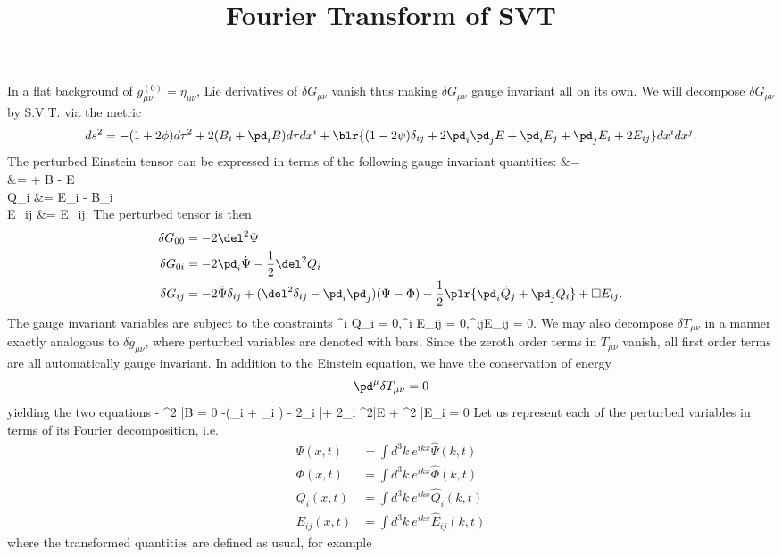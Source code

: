 \documentclass[10pt,letterpaper]{article}
\title{Fourier Transform of SVT}
\author{}
\date{}
\begin{document}
\maketitle 
In a flat background of $g_{\mu\nu}^{(0)} = \eta_{\mu\nu}$, Lie derivatives of $\delta G_{\mu\nu}$ vanish thus making $\delta G_{\mu\nu}$ gauge invariant all on its own. We will decompose $\delta G_{\mu\nu}$ by S.V.T. via the metric
\[
	ds^2 = -(1+2\phi)d\tau^2 + 2(B_i + \pd_i B)d\tau dx^i + \blr{ (1-2\psi)\delta_{ij} + 2\pd_i \pd_j E + \pd_i E_j + \pd_j E_i + 2E_{ij}}dx^idx^j.
\]
The perturbed Einstein tensor can be expressed in terms of the following gauge invariant quantities:
\ba
	\Psi &= \psi\\
	\Phi &= \phi + \dot B - \ddot E\\
	Q_i &= \dot E_i - B_i\\
	E_{ij} &= E_{ij}.
\ea
The perturbed tensor is then 
\begin{align}
	\delta G_{00} &= -2\del^2 \Psi \\
	\delta G_{0i}  &= -2\pd_i \dot \Psi - \frac12 \del^2Q_i \\
	\delta G_{ij} &= -2\ddot \Psi \delta_{ij} + (\del^2\delta_{ij}-\pd_i \pd_j)(\Psi - \Phi) - \frac12\plr{\pd_i \dot Q_j+\pd_j \dot Q_i}  + \Box E_{ij}.
\end{align}
The gauge invariant variables are subject to the constraints
\be
	\pd^i Q_i = 0,\qquad \pd^i E_{ij} = 0,\qquad \delta^{ij}E_{ij} = 0.
\ee
We may also decompose $\delta T_{\mu\nu}$ in a manner exactly analogous to $\delta g_{\mu\nu}$, where perturbed variables are denoted with bars. Since the zeroth order terms in $T_{\mu\nu}$ vanish, all first order terms are all automatically gauge invariant. In addition to the Einstein equation, we have the conservation of energy
\[
	\pd^\mu \delta T_{\mu\nu} = 0
\]
yielding the two equations
\dot{\bar{\phi}} - \del^2 \bar B = 0
\ee
\be
	-(_i + \pd_i ) - 2\pd_i \bar\psi + 2\pd_i \del^2\bar E + \del^2 \bar{E}_i = 0
\ee
Let us represent each of the perturbed variables in terms of its Fourier decomposition, i.e.
\begin{align}
	\Psi(x,t) &= \int d^3k\  e^{ikx} \hat \Psi(k,t)\\
	\Phi(x,t) &= \int d^3k\  e^{ikx} \hat \Phi(k,t)\\
	Q_i(x,t)&= \int d^3k\  e^{ikx} \hat Q_i(k,t)\\
	E_{ij}(x,t) &= \int d^3k\  e^{ikx} \hat E_{ij}(k,t)
\end{align}
where the transformed quantities are defined as usual, for example
\end{document}
